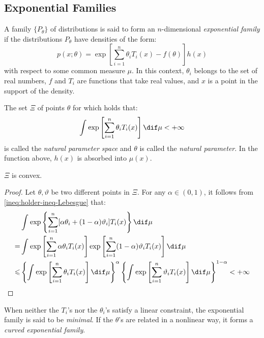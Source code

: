 \subsection{Exponential Families}
\begin{definition}
	A family $\{P_{\theta}\}$ of distributions is said to form an $n$-dimensional \emph{exponential family} if the distributions $P_{\theta}$ have densities of the form:
	\begin{equation*}
		p(x;\theta)=\exp\left[\sum_{i=1}^{n}\theta_iT_i(x)-f(\theta)\right]h(x)
	\end{equation*}
	with respect to some common measure $\mu$. In this context, $\theta_i$ belongs to the set of real numbers, $f$ and $T_i$ are functions that take real values, and $x$ is a point in the support of the density. 
\end{definition}
\begin{definition}
	The set $\Xi$ of points $\theta$ for which holds that:
	\begin{equation*}
		\int_{}^{}\exp\left[\sum_{i=1}^{n}\theta_iT_i(x)\right]\dif\mu<+\infty
	\end{equation*}
	is called the \emph{natural parameter space} and $\theta$ is called the \emph{natural parameter}. In the function above, $h(x)$ is absorbed into $\mu(x)$.
\end{definition}
\begin{theorem}
	$\Xi$ is convex.
\end{theorem}
\begin{proof}
	Let $\theta,\vartheta$ be two different points in $\Xi$. For any $\alpha\in(0,1)$, it follows from \cref{ineq:holder-ineq-Lebesgue} that:
	\begin{align*}
		&\int_{}^{}\exp\left\{\sum_{i=1}^{n}[\alpha\theta_i+(1-\alpha)\vartheta_i]T_i(x)\right\}\dif\mu \\
		=&\int_{}^{}\exp\left[\sum_{i=1}^{n}\alpha\theta_iT_i(x)\right]\exp\left[\sum_{i=1}^{n}(1-\alpha)\vartheta_iT_i(x)\right]\dif\mu \\
		\leqslant&\left\{\int_{}^{}\exp\left[\sum_{i=1}^{n}\theta_iT_i(x)\right]\dif\mu\right\}^{\alpha}\left\{\int_{}^{}\exp\left[\sum_{i=1}^{n}\vartheta_iT_i(x)\right]\dif\mu\right\}^{1-\alpha}<+\infty\qedhere
	\end{align*}
\end{proof}
\begin{definition}
	When neither the $T_i$'s nor the $\theta_i$'s satisfy a linear constraint, the exponential family is said to be \emph{minimal}. If the $\theta$'s are related in a nonlinear way, it forms a \emph{curved exponential family}.
\end{definition}
